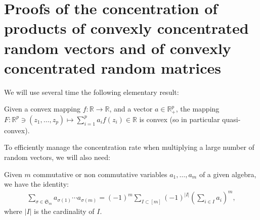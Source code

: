 \documentclass{ws-rmta}
\begin{document}
\appendix
\section{Proofs of the concentration of products of convexly concentrated random vectors and of convexly concentrated random matrices}\label{app:concentration_produit_vecteurs}
We will use several time the following elementary result:
\begin{lemma}\label{lem:sum_f_convexe_convexe}
  Given a convex mapping $f : \mathbb R \to \mathbb R$, and a vector $a \in \mathbb R_+^p$, the mapping $F : \mathbb R^p \ni (z_1,\ldots,z_p) \mapsto \sum_{i=1}^p a_if(z_i) \in \mathbb R$ is convex (so in particular quasi-convex).
\end{lemma}
To efficiently manage the concentration rate when multiplying a large number of random vectors, we will also need:
\begin{lemma}\label{lem:decomposition_poly_symetrique}
  Given $m$ commutative or non commutative variables $a_1,\ldots,a_m$ of a given algebra, we have the identity:
  \begin{align*}
     \sum_{\sigma \in \mathfrak S_m} a_{\sigma(1)}\cdots a_{\sigma(m)} = (-1)^m\sum_{I\subset [m]} (-1)^{|I|} \left(\sum_{i\in I} a_i\right)^m,
  \end{align*}
  where $|I|$ is the cardinality of $I$.
\end{lemma}
\end{document}
